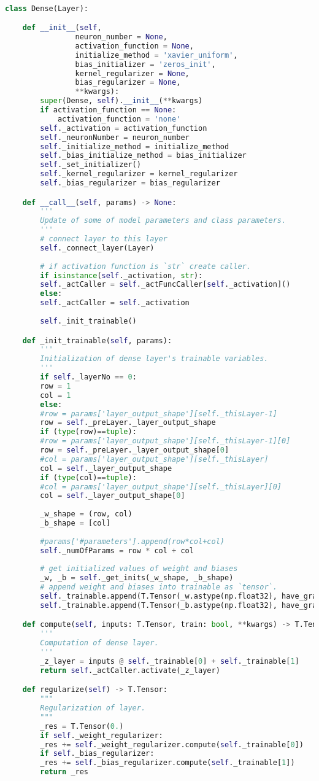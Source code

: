 \documentclass[12pt]{report}
\begin{document}
\begin{lstlisting}[language=Python, numbers=none, caption={Dense Layer implementation.}, label={lis:dense-layer-imp}]

class Dense(Layer):

	def __init__(self,
				neuron_number = None,
				activation_function = None,
				initialize_method = 'xavier_uniform',
				bias_initializer = 'zeros_init',
				kernel_regularizer = None,
				bias_regularizer = None,
				**kwargs):
		super(Dense, self).__init__(**kwargs)
		if activation_function == None:
			activation_function = 'none'
		self._activation = activation_function
		self._neuronNumber = neuron_number
		self._initialize_method = initialize_method
		self._bias_initialize_method = bias_initializer
		self._set_initializer()
		self._kernel_regularizer = kernel_regularizer
		self._bias_regularizer = bias_regularizer

	def __call__(self, params) -> None:
		'''
		Update of some of model parameters and class parameters.
		'''
		# connect layer to this layer
		self._connect_layer(Layer)
		
		# if activation function is `str` create caller.
		if isinstance(self._activation, str):
		self._actCaller = self._actFuncCaller[self._activation]()
		else:
		self._actCaller = self._activation
		
		self._init_trainable()

	def _init_trainable(self, params):
		'''
		Initialization of dense layer's trainable variables.
		'''
		if self._layerNo == 0:
		row = 1
		col = 1
		else:
		#row = params['layer_output_shape'][self._thisLayer-1]
		row = self._preLayer._layer_output_shape
		if (type(row)==tuple):
		#row = params['layer_output_shape'][self._thisLayer-1][0]
		row = self._preLayer._layer_output_shape[0]
		#col = params['layer_output_shape'][self._thisLayer]
		col = self._layer_output_shape
		if (type(col)==tuple):
		#col = params['layer_output_shape'][self._thisLayer][0]
		col = self._layer_output_shape[0]
		
		_w_shape = (row, col)
		_b_shape = [col]
		
		#params['#parameters'].append(row*col+col)
		self._numOfParams = row * col + col
		
		# get initialized values of weight and biases
		_w, _b = self._get_inits(_w_shape, _b_shape)
		# append weight and biases into trainable as `tensor`.
		self._trainable.append(T.Tensor(_w.astype(np.float32), have_grad=True))
		self._trainable.append(T.Tensor(_b.astype(np.float32), have_grad=True))

	def compute(self, inputs: T.Tensor, train: bool, **kwargs) -> T.Tensor:
		'''
		Computation of dense layer.
		'''
		_z_layer = inputs @ self._trainable[0] + self._trainable[1]
		return self._actCaller.activate(_z_layer)

	def regularize(self) -> T.Tensor:
		"""
		Regularization of layer. 
		"""
		_res = T.Tensor(0.)
		if self._weight_regularizer:
		_res += self._weight_regularizer.compute(self._trainable[0])
		if self._bias_regularizer:
		_res += self._bias_regularizer.compute(self._trainable[1])
		return _res
\end{lstlisting}
\end{document}
